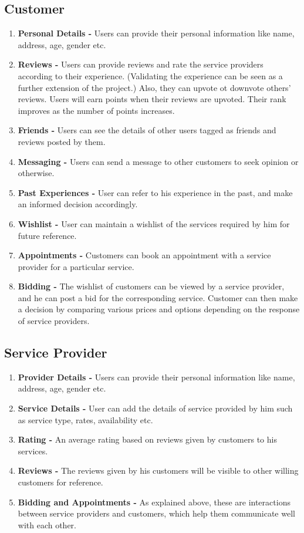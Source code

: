 \documentclass[a4paper]{article}
\begin{document}
\subsection{Customer}
\begin{enumerate}
\item \textbf{Personal Details -} Users can provide their personal information like name, address, age, gender etc. 
\item \textbf{Reviews - }Users can provide reviews and rate the service providers according to their experience. (Validating the experience can be seen as a further extension of the project.) Also, they can upvote ot downvote others' reviews. Users will earn points when their reviews are upvoted. Their rank improves as the number of points increases.
\item \textbf{Friends - }Users can see the details of other users tagged as friends and reviews posted by them.
\item \textbf{Messaging - }Users can send a message to other customers to seek opinion or otherwise.
\item \textbf{Past Experiences - }User can refer to his experience in the past, and make an informed decision accordingly.
\item \textbf{Wishlist - }User can maintain a wishlist of the services required by him for future reference.
\item \textbf{Appointments - } Customers can book an appointment with a service provider for a particular service. 
\item \textbf{Bidding - } The wishlist of customers can be viewed by a service provider, and he can post a bid for the corresponding service. Customer can then make a decision by comparing various prices and options depending on the response of service providers.

\end{enumerate}

\subsection{Service Provider}
\begin{enumerate}
\item \textbf{Provider Details - }Users can provide their personal information like name, address, age, gender etc.
\item \textbf{Service Details - }User can add the details of service provided by him such as service type, rates, availability etc. 
\item \textbf{Rating - }An average rating based on reviews given by customers to his services.
\item \textbf{Reviews - }The reviews given by his customers will be visible to other willing customers for reference.
\item \textbf{Bidding and Appointments - } As explained above, these are interactions between service providers and customers, which help them communicate well with each other.

\end{enumerate}
\end{document}
